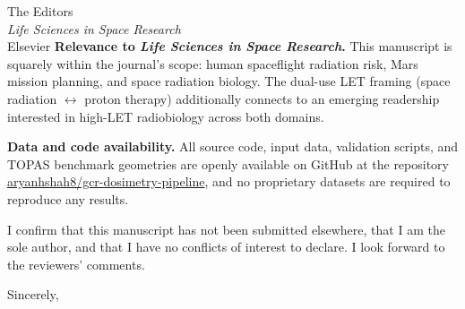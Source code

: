 \documentclass[11pt,letterpaper]{letter}
\begin{document}
\begin{letter}{The Editors\\
  \textit{Life Sciences in Space Research}\\
  Elsevier}
\medskip
\textbf{Relevance to \textit{Life Sciences in Space Research}.}
This manuscript is squarely within the journal's scope: human
spaceflight radiation risk, Mars mission planning, and space radiation
biology.
The dual-use LET framing (space radiation $\leftrightarrow$ proton
therapy) additionally connects to an emerging readership interested in
high-LET radiobiology across both domains.

\medskip
\textbf{Data and code availability.}
All source code, input data, validation scripts, and TOPAS benchmark
geometries are openly available on GitHub at the repository
\href{https://github.com/aryanhshah8/gcr-dosimetry-pipeline}{aryanhshah8/gcr-dosimetry-pipeline},
and no proprietary datasets are required to reproduce any results.

\medskip
I confirm that this manuscript has not been submitted elsewhere, that I
am the sole author, and that I have no conflicts of interest to declare.
I look forward to the reviewers' comments.

\closing{Sincerely,}

\end{letter}
\end{document}
